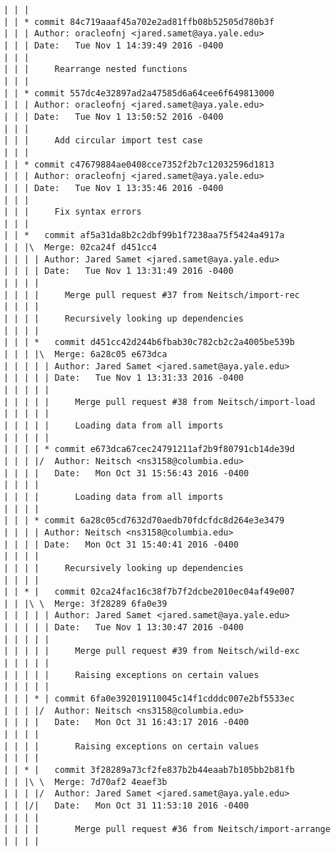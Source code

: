 \begin{lstlisting}
| | |    
| | * commit 84c719aaaf45a702e2ad81ffb08b52505d780b3f
| | | Author: oracleofnj <jared.samet@aya.yale.edu>
| | | Date:   Tue Nov 1 14:39:49 2016 -0400
| | | 
| | |     Rearrange nested functions
| | |    
| | * commit 557dc4e32897ad2a47585d6a64cee6f649813000
| | | Author: oracleofnj <jared.samet@aya.yale.edu>
| | | Date:   Tue Nov 1 13:50:52 2016 -0400
| | | 
| | |     Add circular import test case
| | |    
| | * commit c47679884ae0408cce7352f2b7c12032596d1813
| | | Author: oracleofnj <jared.samet@aya.yale.edu>
| | | Date:   Tue Nov 1 13:35:46 2016 -0400
| | | 
| | |     Fix syntax errors
| | |      
| | *   commit af5a31da8b2c2dbf99b1f7238aa75f5424a4917a
| | |\  Merge: 02ca24f d451cc4
| | | | Author: Jared Samet <jared.samet@aya.yale.edu>
| | | | Date:   Tue Nov 1 13:31:49 2016 -0400
| | | | 
| | | |     Merge pull request #37 from Neitsch/import-rec
| | | |     
| | | |     Recursively looking up dependencies
| | | |       
| | | *   commit d451cc42d244b6fbab30c782cb2c2a4005be539b
| | | |\  Merge: 6a28c05 e673dca
| | | | | Author: Jared Samet <jared.samet@aya.yale.edu>
| | | | | Date:   Tue Nov 1 13:31:33 2016 -0400
| | | | | 
| | | | |     Merge pull request #38 from Neitsch/import-load
| | | | |     
| | | | |     Loading data from all imports
| | | | |      
| | | | * commit e673dca67cec24791211af2b9f80791cb14de39d
| | | |/  Author: Neitsch <ns3158@columbia.edu>
| | | |   Date:   Mon Oct 31 15:56:43 2016 -0400
| | | |   
| | | |       Loading data from all imports
| | | |     
| | | * commit 6a28c05cd7632d70aedb70fdcfdc8d264e3e3479
| | | | Author: Neitsch <ns3158@columbia.edu>
| | | | Date:   Mon Oct 31 15:40:41 2016 -0400
| | | | 
| | | |     Recursively looking up dependencies
| | | |       
| | * |   commit 02ca24fac16c38f7b7f2dcbe2010ec04af49e007
| | |\ \  Merge: 3f28289 6fa0e39
| | | | | Author: Jared Samet <jared.samet@aya.yale.edu>
| | | | | Date:   Tue Nov 1 13:30:47 2016 -0400
| | | | | 
| | | | |     Merge pull request #39 from Neitsch/wild-exc
| | | | |     
| | | | |     Raising exceptions on certain values
| | | | |      
| | | * | commit 6fa0e392019110045c14f1cdddc007e2bf5533ec
| | | |/  Author: Neitsch <ns3158@columbia.edu>
| | | |   Date:   Mon Oct 31 16:43:17 2016 -0400
| | | |   
| | | |       Raising exceptions on certain values
| | | |       
| | * |   commit 3f28289a73cf2fe837b2b44eaab7b105bb2b81fb
| | |\ \  Merge: 7d70af2 4eaef3b
| | | |/  Author: Jared Samet <jared.samet@aya.yale.edu>
| | |/|   Date:   Mon Oct 31 11:53:10 2016 -0400
| | | |   
| | | |       Merge pull request #36 from Neitsch/import-arrange
| | | |       

\end{lstlisting}
